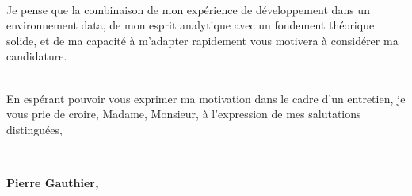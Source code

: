 \documentclass{cv_style}
\begin{document}
    \vspace{0.2cm} \\

    Je pense  que la combinaison de mon expérience de développement dans un environnement data, de mon esprit analytique avec un fondement théorique solide,  et de ma capacité à m'adapter rapidement vous motivera à considérer ma candidature. 

    \vspace{0.2cm} \\
    En espérant pouvoir vous exprimer ma motivation dans le cadre d’un entretien,
    je vous prie de croire, Madame, Monsieur, à l’expression de mes salutations
    distinguées, 

    \\
\vspace{1cm}
\begin{flushright}
\parbox{5cm}{
\centering
    \textbf{Pierre Gauthier,}\\
}
\end{flushright}
\end{document}
